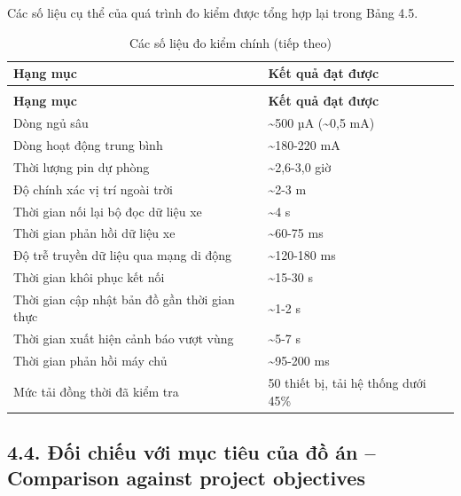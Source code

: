 \documentclass[a4paper]{extarticle}
\newcommand{\thesissettableid}[2]{%
  \renewcommand{\thetable}{#1}%
  \renewcommand{\theHtable}{#2}%
}
\begin{document}
Các số liệu cụ thể của quá trình đo kiểm được tổng hợp lại trong Bảng 4.5.

{\thesissettableid{4.5}{condensed-r2-bang-4-5-cac-so-lieu-do-kiem-chinh}
\def\LTcaptype{table}
\begin{longtable}{|L{(\linewidth - 2\tabcolsep) * }|L{(\linewidth - 2\tabcolsep) * }|}
\caption{Các số liệu đo kiểm chính}\label{tab:condensed-r2-bang-4-5-cac-so-lieu-do-kiem-chinh}\\
\hline
\textbf{Hạng mục} & \textbf{Kết quả đạt được} \\
\hline
\endfirsthead
\caption[]{Các số liệu đo kiểm chính (tiếp theo)}\\
\hline
\textbf{Hạng mục} & \textbf{Kết quả đạt được} \\
\hline
\endhead
\endfoot
\endlastfoot
Dòng ngủ sâu & \textasciitilde500 µA (\textasciitilde0,5 mA) \\\hline
Dòng hoạt động trung bình & \textasciitilde180-220 mA \\\hline
Thời lượng pin dự phòng & \textasciitilde2,6-3,0 giờ \\\hline
Độ chính xác vị trí ngoài trời & \textasciitilde2-3 m \\\hline
Thời gian nối lại bộ đọc dữ liệu xe & \textasciitilde4 s \\\hline
Thời gian phản hồi dữ liệu xe & \textasciitilde60-75 ms \\\hline
Độ trễ truyền dữ liệu qua mạng di động & \textasciitilde120-180 ms \\\hline
Thời gian khôi phục kết nối & \textasciitilde15-30 s \\\hline
Thời gian cập nhật bản đồ gần thời gian thực & \textasciitilde1-2 s \\\hline
Thời gian xuất hiện cảnh báo vượt vùng & \textasciitilde5-7 s \\\hline
Thời gian phản hồi máy chủ & \textasciitilde95-200 ms \\\hline
Mức tải đồng thời đã kiểm tra & 50 thiết bị, tải hệ thống dưới 45\% \\\hline
\end{longtable}
}
\subsection{4.4. Đối chiếu với mục tiêu của đồ án -- Comparison against project objectives}\label{ux111ux1ed1i-chiux1ebfu-vux1edbi-mux1ee5c-tiuxeau-cux1ee7a-ux111ux1ed3-uxe1n-comparison-against-project-objectives}
\end{document}
